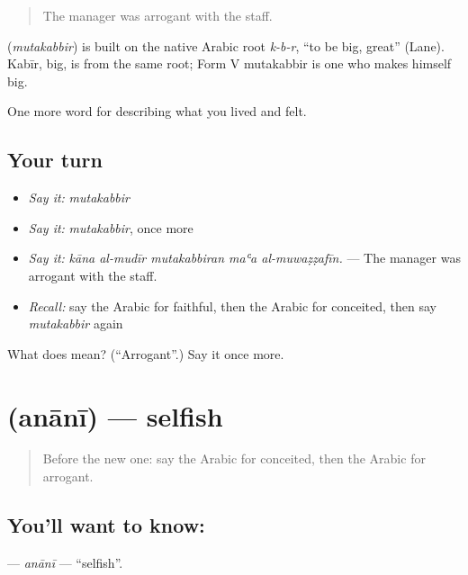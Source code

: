 \begin{quote}
The manager was arrogant with the staff.
\end{quote}

\begin{cousinweb}
\textbf{} (\emph{mutakabbir}) is built on the native Arabic root \emph{k-b-r}, \textquotedblleft{}to be big, great\textquotedblright{} (Lane). Kabīr, big, is from the same root; Form V mutakabbir is one who makes himself big.
\end{cousinweb}

\begin{grammarlens}[title={What you've built}]
One more word for describing what you lived and felt.
\end{grammarlens}

\subsection*{Your turn}
\begin{itemize}
\raggedright
  \item \emph{Say it:} \emph{mutakabbir}
  \item \emph{Say it:} \emph{mutakabbir}, once more
  \item \emph{Say it:} \emph{kāna al-mudīr mutakabbiran maʿa al-muwaẓẓafīn.} — The manager was arrogant with the staff.
  \item \emph{Recall:} say the Arabic for faithful, then the Arabic for conceited, then say \emph{mutakabbir} again
\end{itemize}

\begin{tcolorbox}[breakable,colback=teal!4,colframe=teal!35!black,title={Before you move on}]
What does  mean? (\textquotedblleft{}Arrogant\textquotedblright{}.) Say it once more.
\end{tcolorbox}
\section[\texorpdfstring{\ar{أناني} (anānī)}{أناني (anānī)}]{ (anānī) — selfish}

\label{lesson:AR-C500-anani}



\begin{quote}
Before the new one: say the Arabic for conceited, then the Arabic for arrogant.
\end{quote}

\subsection*{You'll want to know: }
\textbf{} — \emph{anānī} — \textquotedblleft{}selfish\textquotedblright{}.

